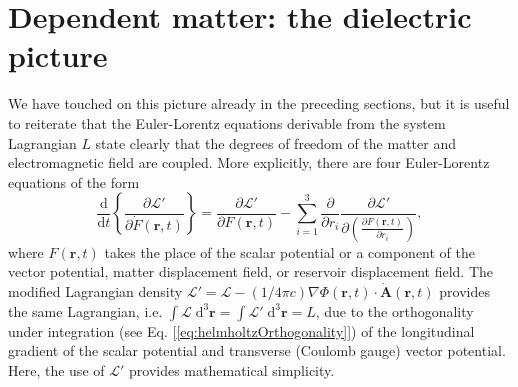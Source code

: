 
\section{Dependent matter: the dielectric picture}\label{app:dependentMatter}

We have touched on this picture already in the preceding sections, but it is useful to reiterate that the Euler-Lorentz equations derivable from the system Lagrangian $L$ state clearly that the degrees of freedom of the matter and electromagnetic field are coupled. More explicitly, there are four Euler-Lorentz equations of the form
\begin{equation}
\frac{\mathrm{d}}{\mathrm{d}t}\left\{\frac{\partial\mathcal{L}'}{\partial\dot{F}(\mathbf{r},t)}\right\} = \frac{\partial\mathcal{L}'}{\partial F(\mathbf{r},t)} - \sum_{i = 1}^3\frac{\partial}{\partial r_i}\frac{\partial\mathcal{L}'}{\partial\left(\frac{\partial F(\mathbf{r},t)}{\partial r_i}\right)},
\end{equation}
where $F(\mathbf{r},t)$ takes the place of the scalar potential or a component of the vector potential, matter displacement field, or reservoir displacement field. The modified Lagrangian density $\mathcal{L}' = \mathcal{L} - (1/4\pi c)\nabla\Phi(\mathbf{r},t)\cdot\dot{\mathbf{A}}(\mathbf{r},t)$ provides the same Lagrangian, i.e. $\int\mathcal{L}\;\mathrm{d}^3\mathbf{r} = \int\mathcal{L}'\;\mathrm{d}^3\mathbf{r} = L$, due to the orthogonality under integration (see Eq. [\ref{eq:helmholtzOrthogonality}]) of the longitudinal gradient of the scalar potential and transverse (Coulomb gauge) vector potential. Here, the use of $\mathcal{L}'$ provides mathematical simplicity.

